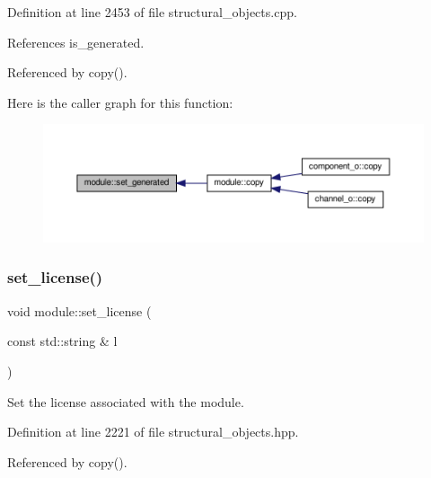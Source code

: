Definition at line 2453 of file structural\+\_\+objects.\+cpp.



References is\+\_\+generated.



Referenced by copy().

Here is the caller graph for this function\+:
\nopagebreak
\begin{figure}[H]
\begin{center}
\leavevmode
\includegraphics[width=350pt]{d0/dd3/classmodule_a270ec9a8ef484b315e81d013214ba328_icgraph}
\end{center}
\end{figure}
\mbox{\label{classmodule_a0555b71dacade36ae76091d28854472c}} 
\subsubsection{\texorpdfstring{set\+\_\+license()}{set\_license()}}
{\footnotesize\ttfamily void module\+::set\+\_\+license (\begin{DoxyParamCaption}\item[{const std\+::string \&}]{l }\end{DoxyParamCaption})\hspace{0.3cm}{\ttfamily [inline]}}



Set the license associated with the module. 



Definition at line 2221 of file structural\+\_\+objects.\+hpp.



Referenced by copy().

